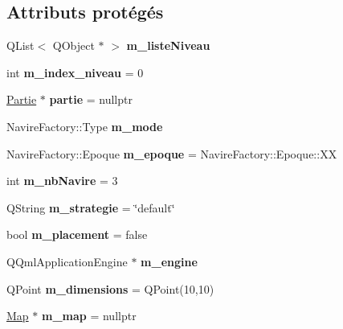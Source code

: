 \subsection*{Attributs protégés}
\begin{DoxyCompactItemize}
\item 
Q\+List$<$ Q\+Object $\ast$ $>$ {\bfseries m\+\_\+liste\+Niveau}\hypertarget{class_launcher_aad53e1b71b8a75e1750dcfaa4865bd1c}{}\label{class_launcher_aad53e1b71b8a75e1750dcfaa4865bd1c}

\item 
int {\bfseries m\+\_\+index\+\_\+niveau} = 0\hypertarget{class_launcher_a907c78bc7fee7c8a909b74caed883f6e}{}\label{class_launcher_a907c78bc7fee7c8a909b74caed883f6e}

\item 
\hyperlink{class_partie}{Partie} $\ast$ {\bfseries partie} = nullptr\hypertarget{class_launcher_a9a3398a253707bf673e984c87f8ab6ad}{}\label{class_launcher_a9a3398a253707bf673e984c87f8ab6ad}

\item 
Navire\+Factory\+::\+Type {\bfseries m\+\_\+mode}\hypertarget{class_launcher_a54bbd14816ad4c6b140e9aceb5d2e795}{}\label{class_launcher_a54bbd14816ad4c6b140e9aceb5d2e795}

\item 
Navire\+Factory\+::\+Epoque {\bfseries m\+\_\+epoque} = Navire\+Factory\+::\+Epoque\+::\+XX\hypertarget{class_launcher_a5eb8d3986315d6a5cc9abd2bbfaa41a1}{}\label{class_launcher_a5eb8d3986315d6a5cc9abd2bbfaa41a1}

\item 
int {\bfseries m\+\_\+nb\+Navire} = 3\hypertarget{class_launcher_aeda234c735529c97812a69f3470dbcc9}{}\label{class_launcher_aeda234c735529c97812a69f3470dbcc9}

\item 
Q\+String {\bfseries m\+\_\+strategie} = \char`\"{}default\char`\"{}\hypertarget{class_launcher_a9e01a5476729d03a4f806f06cbf551bd}{}\label{class_launcher_a9e01a5476729d03a4f806f06cbf551bd}

\item 
bool {\bfseries m\+\_\+placement} = false\hypertarget{class_launcher_a54392937a9852e1efc37287e8943eafd}{}\label{class_launcher_a54392937a9852e1efc37287e8943eafd}

\item 
Q\+Qml\+Application\+Engine $\ast$ {\bfseries m\+\_\+engine}\hypertarget{class_launcher_abfdd9c4e05cb09342c8e2dfee924b339}{}\label{class_launcher_abfdd9c4e05cb09342c8e2dfee924b339}

\item 
Q\+Point {\bfseries m\+\_\+dimensions} = Q\+Point(10,10)\hypertarget{class_launcher_aeb5da8a5148fcb0dad2583536bedb235}{}\label{class_launcher_aeb5da8a5148fcb0dad2583536bedb235}

\item 
\hyperlink{class_map}{Map} $\ast$ {\bfseries m\+\_\+map} = nullptr\hypertarget{class_launcher_a27f701fa3cc5c82cdf77746997ed4f95}{}\label{class_launcher_a27f701fa3cc5c82cdf77746997ed4f95}

\end{DoxyCompactItemize}
